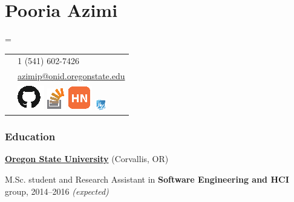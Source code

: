 \documentclass{tccv}
\newcommand{\plus}{\raisebox{.1\height}{\scalebox{.8}{+}}}
\begin{document}
\thispagestyle{empty}
\part{Pooria Azimi}






\vspace{4.5pt}


\needspace{0.5\textheight}%
    \newdimen\boxwidth%
    \boxwidth=\dimexpr{}\fboxsep\relax%
    \colorbox[HTML]{BEDBE3}{%
    \begin{tabularx}{\boxwidth}{c|X}
	    \Telefon     & 
	    {\plus{ }1 (541) 602-7426}\smallskip\\
	   \Letter      & 
	    \href{mailto:azimip@onid.oregonstate.edu}{azimip@onid.oregonstate.edu}
	    \\[3pt]
	     & 
		\href{https://github.com/pooriaazimi/}{\includegraphics{Logos/GitHub.eps}}
		\href{http://stackoverflow.com/users/347353/pooria-azimi}{\includegraphics{Logos/StackOverflow.eps}}
		\href{https://news.ycombinator.com/user?id=pooriaazimi}{\includegraphics{Logos/HN.eps}}
		\href{http://forum.irmug.com}{\includegraphics[width=14pt]{Logos/IRMUG.pdf}}
	\end{tabularx}}
	
	
	

\section{Education}

{\bf \href{http://oregonstate.edu}{Oregon State University}} (Corvallis, OR)

\hspace{7pt} M.Sc. student and Research Assistant in {\bf Software Engineering and HCI} group, 2014--2016 \textit{(expected)}


\vspace{5pt}
\end{document}
